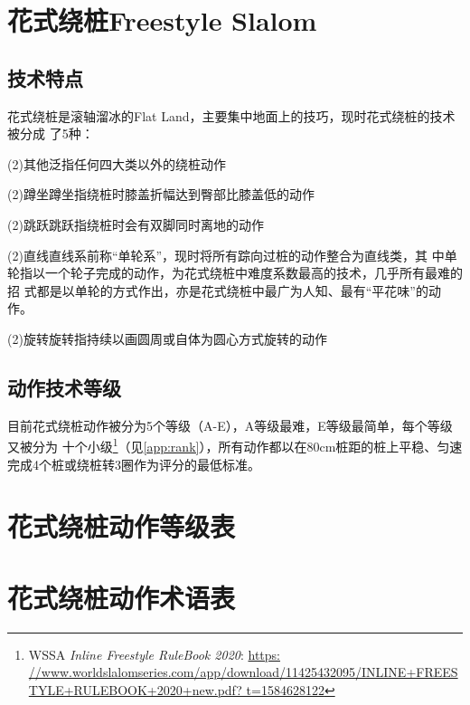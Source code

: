 \documentclass[12pt]{ctexart}
\begin{document}
\section{花式绕桩Freestyle Slalom}
\subsection{技术特点}
花式绕桩是滚轴溜冰的Flat Land，主要集中地面上的技巧，现时花式绕桩的技术被分成
了5种\cite{wiki:skating}：

\bsctype(2){其他}泛指任何四大类以外的绕桩动作

\bsctype(2){蹲坐}蹲坐指绕桩时膝盖折幅达到臀部比膝盖低的动作

\bsctype(2){跳跃}跳跃指绕桩时会有双脚同时离地的动作

\bsctype(2){直线}直线系前称“单轮系”，现时将所有踪向过桩的动作整合为直线类，其
中单轮指以一个轮子完成的动作，为花式绕桩中难度系数最高的技术，几乎所有最难的招
式都是以单轮的方式作出，亦是花式绕桩中最广为人知、最有“平花味”的动作。

\bsctype(2){旋转}旋转指持续以画圆周或自体为圆心方式旋转的动作

\subsection{动作技术等级}
目前花式绕桩动作被分为5个等级（A-E），A等级最难，E等级最简单，每个等级又被分为
十个小级\footnote{WSSA \emph{Inline Freestyle RuleBook 2020}: \url{https:
//www.worldslalomseries.com/app/download/11425432095/INLINE+FREESTYLE+RULEBOOK+2020+new.pdf?
t=1584628122}}（见\autoref{app:rank}），所有动作都以在80\si{cm}桩距的桩上平稳、匀速
完成4个桩或绕桩转3圈作为评分的最低标准。

\clearpage


\clearpage
\begin{appendices}
  \section{花式绕桩动作等级表}
  \label{app:rank}
  
  \clearpage
  \section{花式绕桩动作术语表}
  
\end{appendices}
\end{document}
